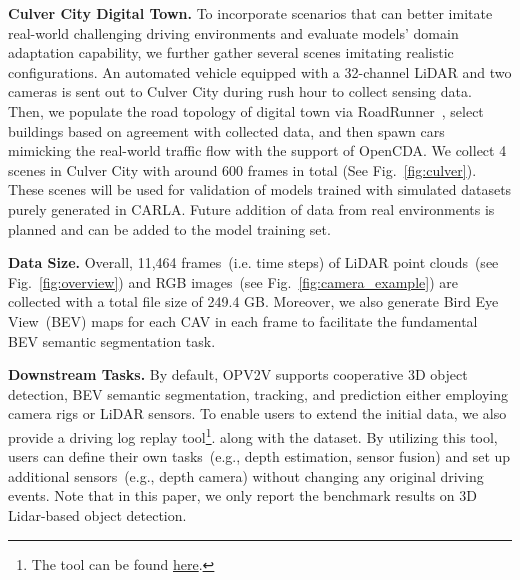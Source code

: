 \documentclass[letterpaper, 10 pt, conference]{ieeeconf}  %
\begin{document}


\noindent\textbf{Culver City Digital Town.} To incorporate scenarios that can better imitate real-world challenging driving environments and evaluate models' domain adaptation capability, we further gather several scenes imitating realistic configurations. An automated vehicle equipped with a 32-channel LiDAR and two cameras is sent out to Culver City during rush hour to collect sensing data. Then, we populate the road topology of digital town via RoadRunner~\cite{roadrunner}, select buildings based on agreement with collected data, and then spawn cars mimicking the real-world traffic flow with the support of OpenCDA. We collect 4 scenes in Culver City with around 600 frames in total (See Fig.~\ref{fig:culver}). These scenes will be used for validation of models trained with simulated datasets purely generated in CARLA. Future addition of data from real environments is planned and can be added to the model training set.

\noindent\textbf{Data Size.} Overall, 11,464 frames~(i.e. time steps) of LiDAR point clouds~(see Fig.~\ref{fig:overview}) and RGB images~(see Fig.~\ref{fig:camera_example}) are collected with a total file size of 249.4 GB. Moreover, we also generate Bird Eye View~(BEV) maps for each CAV in each frame to facilitate the fundamental BEV semantic segmentation task.

\noindent\textbf{Downstream Tasks.} By default, OPV2V supports cooperative 3D object detection, BEV semantic segmentation, tracking, and prediction either employing camera rigs or LiDAR sensors. To enable users to extend the initial data, we also provide a driving log replay tool\footnote{The tool can be found  \textcolor{blue}{\href{https://github.com/DerrickXuNu/OpenCOOD/tree/feature/log_replay/logreplay}{here}}.}.  along with the dataset. By utilizing this tool, users can define their own tasks~(e.g., depth estimation, sensor fusion) and set up additional sensors~(e.g., depth camera) without changing any original driving events. Note that in this paper, we only report the benchmark results on 3D Lidar-based object detection.
\end{document}
